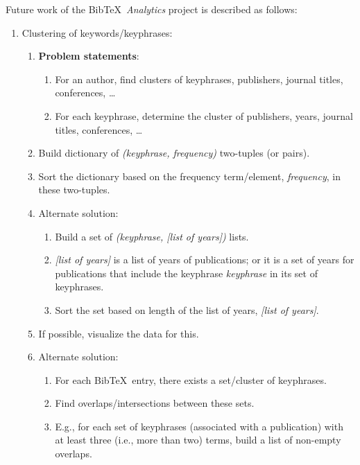 Future work of the {\sc Bib}\TeX\ {\it Analytics} project is described as follows: \vspace{-0.3cm}
\begin{enumerate} \itemsep -4pt
\item Clustering of keywords/keyphrases: \vspace{-0.3cm}
	\begin{enumerate} \itemsep -2pt
	\item {\bf Problem statements}: \vspace{-0.2cm}
		\begin{enumerate} \itemsep -2pt
		\item For an author, find clusters of keyphrases, publishers, journal titles, conferences, \dots
		\item For each keyphrase, determine the cluster of publishers, years, journal titles, conferences, \dots
		\end{enumerate}
	\item Build dictionary of {\it (keyphrase, frequency)} two-tuples (or pairs).
	\item Sort the dictionary based on the frequency term/element, {\it frequency}, in these two-tuples.
	\item Alternate solution: \vspace{-0.2cm}
		\begin{enumerate} \itemsep -2pt
		\item Build a set of {\it (keyphrase, [list of years])} lists.
		\item {\it [list of years]} is a list of years of publications; or it is a set of years for publications that include the keyphrase {\it keyphrase} in its set of keyphrases.
		\item Sort the set based on length of the list of years, {\it [list of years]}.
		\end{enumerate}
	\item If possible, visualize the data for this.
	\item Alternate solution: \vspace{-0.2cm}
		\begin{enumerate} \itemsep -2pt
		\item For each {\sc Bib}\TeX\ entry, there exists a set/cluster of keyphrases.
		\item Find overlaps/intersections between these sets.
		\item E.g., for each set of keyphrases (associated with a publication) with at least three (i.e., more than two) terms, build a list of non-empty overlaps.

\end{enumerate}
\end{enumerate}
\end{enumerate}

